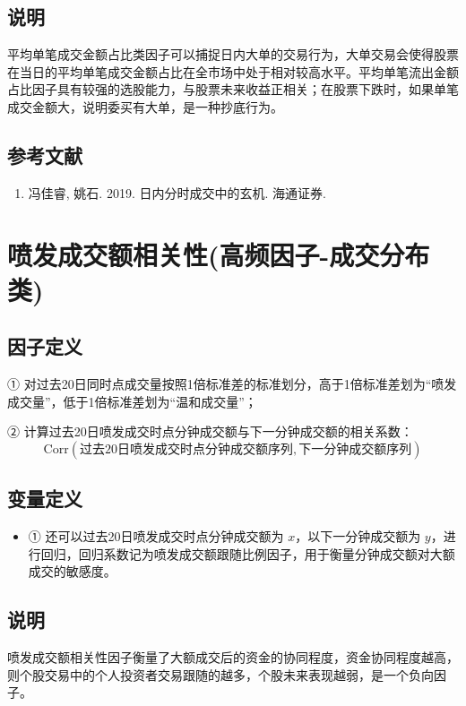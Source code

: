 \documentclass{article}
\begin{document}
\subsection{说明}
平均单笔成交金额占比类因子可以捕捉日内大单的交易行为，大单交易会使得股票在当日的平均单笔成交金额占比在全市场中处于相对较高水平。平均单笔流出金额占比因子具有较强的选股能力，与股票未来收益正相关；在股票下跌时，如果单笔成交金额大，说明委买有大单，是一种抄底行为。

\subsection{参考文献}
\begin{enumerate}
    \item 冯佳睿, 姚石. 2019. 日内分时成交中的玄机. 海通证券.
\end{enumerate}

\section{喷发成交额相关性(高频因子-成交分布类)}

\subsection{因子定义}

① 对过去20日同时点成交量按照1倍标准差的标准划分，高于1倍标准差划为“喷发成交量”，低于1倍标准差划为“温和成交量”；

② 计算过去20日喷发成交时点分钟成交额与下一分钟成交额的相关系数：
\begin{equation}
    \mathrm{Corr}(\text{过去20日喷发成交时点分钟成交额序列}, \text{下一分钟成交额序列})
\end{equation}

\subsection{变量定义}
\begin{itemize}
    \item ① 还可以过去20日喷发成交时点分钟成交额为 \( x \)，以下一分钟成交额为 \( y \)，进行回归，回归系数记为喷发成交额跟随比例因子，用于衡量分钟成交额对大额成交的敏感度。
\end{itemize}

\subsection{说明}
喷发成交额相关性因子衡量了大额成交后的资金的协同程度，资金协同程度越高，则个股交易中的个人投资者交易跟随的越多，个股未来表现越弱，是一个负向因子。
\end{document}
